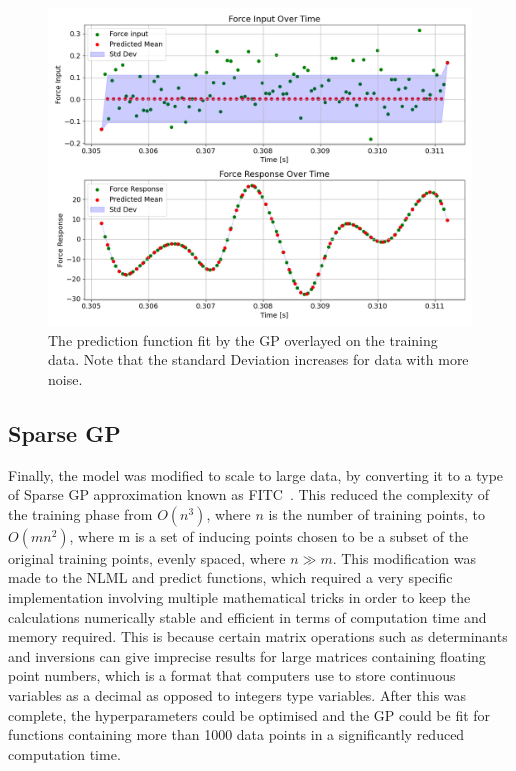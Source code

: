 \documentclass[12pt]{article}
\begin{document}
    \begin{figure}[ht]
        \centering
        \includegraphics[width=1.0\linewidth]{figures/input-response-predict/input-response-predict.png}
        \caption{The prediction function fit by the GP overlayed on the training data. Note that the standard Deviation increases for data with more noise.}
        \label{fig:input-response-predict}
    \end{figure}

    \subsection{Sparse GP}
    Finally, the model was modified to scale to large data, by converting it to a type of Sparse GP approximation known as FITC~\cite{q-candela}.
    This reduced the complexity of the training phase from $O(n^3)$, where $n$ is the number of training points, to $O(mn^2)$, where m is a set of inducing points chosen to be a subset of the original training points, evenly spaced, where $n \gg m$.   
    This modification was made to the NLML and predict functions, which required a very specific implementation involving multiple mathematical tricks in order to keep the calculations numerically stable and efficient in terms of computation time and memory required.
    This is because certain matrix operations such as determinants and inversions can give imprecise results for large matrices containing floating point numbers, which is a format that computers use to store continuous variables as a decimal as opposed to integers type variables.
    After this was complete, the hyperparameters could be optimised and the GP could be fit for functions containing more than 1000 data points in a significantly reduced computation time. %
\end{document}
